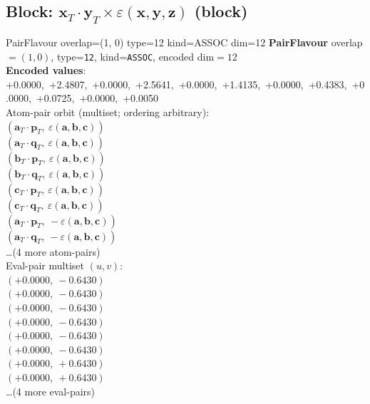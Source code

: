 \documentclass[a4paper,11pt]{article}
\newcommand{\fpbeomcfokjooi}[2]{\mathbf{#1}_T \cdot \mathbf{#2}_T}
\newcommand{\kblbmcpggoncpf}[3]{\varepsilon(\mathbf{#1},\mathbf{#2},\mathbf{#3})}
\begin{document}
\subsection{Block: $\fpbeomcfokjooi{x}{y} \times \kblbmcpggoncpf{x}{y}{z}$  (block)}
    PairFlavour  overlap=(1, 0)  type=12  kind=ASSOC  dim=12
\textbf{PairFlavour} overlap$=(1, 0)$, type=\texttt{12}, kind=\texttt{ASSOC}, encoded dim$=12$\\
\textbf{      Encoded values}: +0.0000,\ +2.4807,\ +0.0000,\ +2.5641,\ +0.0000,\ +1.4135,\ +0.0000,\ +0.4383,\ +0.0000,\ +0.0725,\ +0.0000,\ +0.0050\\
\quad Atom-pair orbit (multiset; ordering arbitrary):\\
$(\fpbeomcfokjooi{a}{p},\ \kblbmcpggoncpf{a}{b}{c})$\\
$(\fpbeomcfokjooi{a}{q},\ \kblbmcpggoncpf{a}{b}{c})$\\
$(\fpbeomcfokjooi{b}{p},\ \kblbmcpggoncpf{a}{b}{c})$\\
$(\fpbeomcfokjooi{b}{q},\ \kblbmcpggoncpf{a}{b}{c})$\\
$(\fpbeomcfokjooi{c}{p},\ \kblbmcpggoncpf{a}{b}{c})$\\
$(\fpbeomcfokjooi{c}{q},\ \kblbmcpggoncpf{a}{b}{c})$\\
$(\fpbeomcfokjooi{a}{p},\ -\kblbmcpggoncpf{a}{b}{c})$\\
$(\fpbeomcfokjooi{a}{q},\ -\kblbmcpggoncpf{a}{b}{c})$\\
\quad \ldots (4 more atom-pairs)\\
\quad Eval-pair multiset $(u, v)$:\\
$(+0.0000,\ -0.6430)$\\
$(+0.0000,\ -0.6430)$\\
$(+0.0000,\ -0.6430)$\\
$(+0.0000,\ -0.6430)$\\
$(+0.0000,\ -0.6430)$\\
$(+0.0000,\ -0.6430)$\\
$(+0.0000,\ +0.6430)$\\
$(+0.0000,\ +0.6430)$\\
\quad \ldots (4 more eval-pairs)\\
\end{document}
